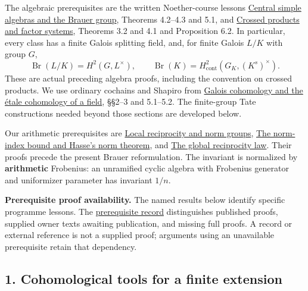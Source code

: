 \documentclass[11pt,a4paper]{article}
\begin{document}
The algebraic prerequisites are the written Noether-course lessons
\href{https://kokunoyumeto.github.io/open-math-courses/courses/AG-LTF/support/NOE-HYP--NOE-HYP-04.html\#4-maximal-subfields-and-splitting-fields}{Central
simple algebras and the Brauer group}, Theorems 4.2--4.3 and 5.1, and
\href{https://kokunoyumeto.github.io/open-math-courses/courses/AG-LTF/support/NOE-HYP--NOE-HYP-05.html\#3-multiplication-in-the-relative-brauer-group}{Crossed
products and factor systems}, Theorems 3.2 and 4.1 and Proposition 6.2.
In particular, every class has a finite Galois splitting field, and, for
finite Galois \(L/K\) with group \(G\), \[
\operatorname{Br}(L/K)=H^2(G,L^\times),\qquad
\operatorname{Br}(K)=H^2_{\mathrm{cont}}(G_K,(K^s)^\times).
\tag{1}
\] These are actual preceding algebra proofs, including the convention
on crossed products. We use ordinary cochains and Shapiro from
\href{https://kokunoyumeto.github.io/open-math-courses/courses/ag-etale-cohomology/galois-cohomology-and-the-etale-cohomology-of-a-field.html}{Galois
cohomology and the étale cohomology of a field}, §§2--3 and 5.1--5.2.
The finite-group Tate constructions needed beyond those sections are
developed below.

Our arithmetic prerequisites are
\href{../local-reciprocity-and-norm-groups.html}{Local reciprocity and
norm groups},
\href{../the-norm-index-bound-and-hasses-norm-theorem.html}{The
norm-index bound and Hasse's norm theorem}, and
\href{../the-global-reciprocity-law.html}{The global reciprocity law}.
Their proofs precede the present Brauer reformulation. The invariant is
normalized by \textbf{arithmetic} Frobenius: an unramified cyclic
algebra with Frobenius generator and uniformizer parameter has invariant
\(1/n\).

\textbf{Prerequisite proof availability.} The named results below
identify specific programme lessons. The
\href{https://kokunoyumeto.github.io/open-math-courses/courses/NT-CFT/proof-dependencies.html\#lesson-24}{prerequisite
record} distinguishes published proofs, supplied owner texts awaiting
publication, and missing full proofs. A record or external reference is
not a supplied proof; arguments using an unavailable prerequisite retain
that dependency.

\subsection{1. Cohomological tools for a finite
extension}\label{cohomological-tools-for-a-finite-extension}
\end{document}
